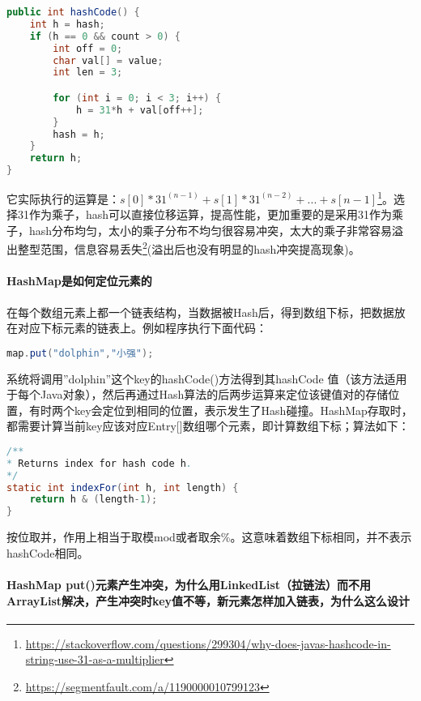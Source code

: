 \documentclass[../../../interview-questions.tex]{subfiles}
\begin{document}
\begin{lstlisting}[language=Java]
public int hashCode() {
    int h = hash;
    if (h == 0 && count > 0) {
        int off = 0;
        char val[] = value;
        int len = 3;

        for (int i = 0; i < 3; i++) {
            h = 31*h + val[off++];
        }
        hash = h;
    }
    return h;
}
\end{lstlisting}



它实际执行的运算是：$s[0]*31^{(n-1)} + s[1]*31^{(n-2)} + ... + s[n-1]$\footnote{\url{https://stackoverflow.com/questions/299304/why-does-javas-hashcode-in-string-use-31-as-a-multiplier}}。选择31作为乘子，hash可以直接位移运算，提高性能，更加重要的是采用31作为乘子，hash分布均匀，太小的乘子分布不均匀很容易冲突，太大的乘子非常容易溢出整型范围，信息容易丢失\footnote{\url{https://segmentfault.com/a/1190000010799123}}(溢出后也没有明显的hash冲突提高现象)。

\paragraph{HashMap是如何定位元素的}

在每个数组元素上都一个链表结构，当数据被Hash后，得到数组下标，把数据放在对应下标元素的链表上。例如程序执行下面代码：

\begin{lstlisting}[language=Java]
map.put("dolphin","小强");
\end{lstlisting}

系统将调用”dolphin”这个key的hashCode()方法得到其hashCode 值（该方法适用于每个Java对象），然后再通过Hash算法的后两步运算来定位该键值对的存储位置，有时两个key会定位到相同的位置，表示发生了Hash碰撞。HashMap存取时，都需要计算当前key应该对应Entry[]数组哪个元素，即计算数组下标；算法如下：

\begin{lstlisting}[language=Java]
/**
* Returns index for hash code h.
*/
static int indexFor(int h, int length) {
	return h & (length-1);
}
\end{lstlisting}

按位取并，作用上相当于取模mod或者取余\%。这意味着数组下标相同，并不表示hashCode相同。


\paragraph{HashMap put()元素产生冲突，为什么用LinkedList（拉链法）而不用ArrayList解决，产生冲突时key值不等，新元素怎样加入链表，为什么这么设计}
\end{document}
